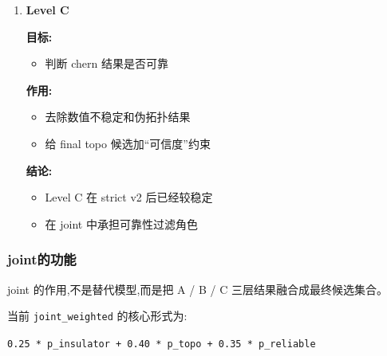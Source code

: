 \documentclass[lang=cn,scheme=chinese,color=blue,device=normal,toc=onecol,math=cm]{elegantbook}
\begin{document}
\begin{enumerate}
\textbf{关键结论:}\par
 
\begin{itemize}
\item 初期 strict 版 Level B 区分能力不够强
\item 通过定向增样和多轮 refine 数据回流后,Level B 的 \texttt{roc\_\allowbreak{}auc /\allowbreak{} ap} 明显提升
\item 说明 ML 闭环确实有效
\end{itemize}
\item \textbf{Level C}\par
 
\textbf{目标:}\par
 
\begin{itemize}
\item 判断 chern 结果是否可靠
\end{itemize}
 
\textbf{作用:}\par
 
\begin{itemize}
\item 去除数值不稳定和伪拓扑结果
\item 给 final topo 候选加“可信度”约束
\end{itemize}
 
\textbf{结论:}\par
 
\begin{itemize}
\item Level C 在 strict v2 后已经较稳定
\item 在 joint 中承担可靠性过滤角色
\end{itemize}
\end{enumerate}


\subsubsection{joint的功能}


joint 的作用,不是替代模型,而是把 A /\allowbreak{} B /\allowbreak{} C 三层结果融合成最终候选集合。\par


当前 \texttt{joint\_\allowbreak{}weighted} 的核心形式为:\par


\texttt{0.25 * p\_\allowbreak{}insulator + 0.40 * p\_\allowbreak{}topo + 0.35 * p\_\allowbreak{}reliable}\par
\end{document}
